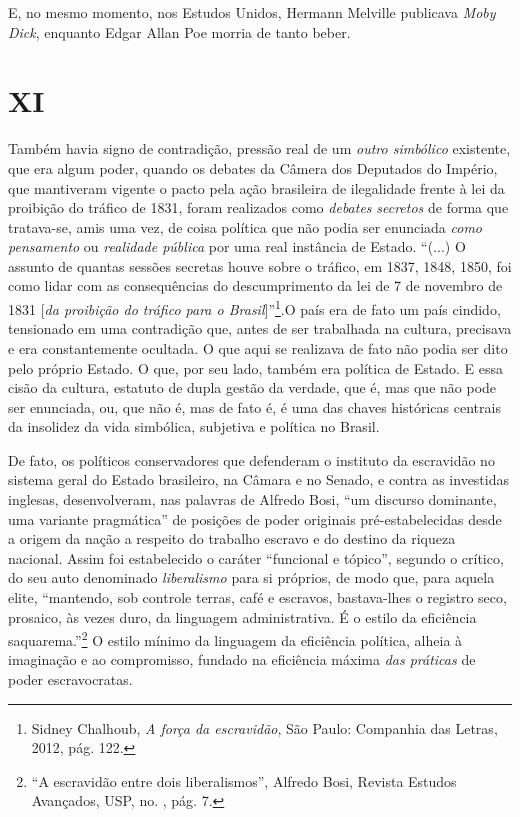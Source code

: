 E, no mesmo momento, nos Estudos Unidos, Hermann Melville publicava
\emph{Moby Dick}, enquanto Edgar Allan Poe morria de tanto beber.

\section{XI}

Também havia signo de contradição, pressão real de um \emph{outro
simbólico} existente, que era algum poder, quando os debates da Câmera
dos Deputados do Império, que mantiveram vigente o pacto pela ação
brasileira de ilegalidade frente à lei da proibição do tráfico de 1831,
foram realizados como \emph{debates} \emph{secretos} de forma que
tratava-se, amis uma vez, de coisa política que não podia ser enunciada
\emph{como pensamento} ou \emph{realidade pública} por uma real
instância de Estado. ``(...) O assunto de quantas sessões secretas houve
sobre o tráfico, em 1837, 1848, 1850, foi como lidar com as
consequências do descumprimento da lei de 7 de novembro de 1831
{[}\emph{da proibição do tráfico para o Brasil}{]}''\footnote{Sidney
  Chalhoub, \emph{A força da escravidão}, São Paulo: Companhia das
  Letras, 2012, pág. 122.}.O país era de fato um país cindido,
tensionado em uma contradição que, antes de ser trabalhada na cultura,
precisava e era constantemente ocultada. O que aqui se realizava de fato
não podia ser dito pelo próprio Estado. O que, por seu lado, também era
política de Estado. E essa cisão da cultura, estatuto de dupla gestão da
verdade, que é, mas que não pode ser enunciada, ou, que não é, mas de
fato é, é uma das chaves históricas centrais da insolidez da vida
simbólica, subjetiva e política no Brasil.

De fato, os políticos conservadores que defenderam o instituto da
escravidão no sistema geral do Estado brasileiro, na Câmara e no Senado,
e contra as investidas inglesas, desenvolveram, nas palavras de Alfredo
Bosi, ``um discurso dominante, uma variante pragmática'' de posições de
poder originais pré-estabelecidas desde a origem da nação a respeito do
trabalho escravo e do destino da riqueza nacional. Assim foi
estabelecido o caráter ``funcional e tópico'', segundo o crítico, do seu
auto denominado \emph{liberalismo} para si próprios, de modo que, para
aquela elite, ``mantendo, sob controle terras, café e escravos,
bastava-lhes o registro seco, prosaico, às vezes duro, da linguagem
administrativa. É o estilo da eficiência saquarema.''\footnote{``A
  escravidão entre dois liberalismos'', Alfredo Bosi, Revista Estudos
  Avançados, USP, no. , pág. 7.} O estilo mínimo da linguagem da
eficiência política, alheia à imaginação e ao compromisso, fundado na
eficiência máxima \emph{das práticas} de poder escravocratas.

